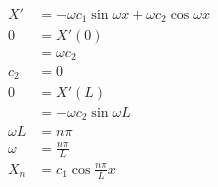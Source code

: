 \documentclass{article}
\begin{document}
\begin{align*}
  X'                                                   & = -\omega c_1 \sin \omega x + \omega c_2 \cos \omega x                                                                                                                                                  \\
  0                                                    & = X'(0)                                                                                                                                                                                                 \\
                                                       & = \omega c_2                                                                                                                                                                                            \\
  c_2                                                  & = 0                                                                                                                                                                                                     \\
  0                                                    & = X'(L)                                                                                                                                                                                                 \\
                                                       & = -\omega c_2 \sin \omega L                                                                                                                                                                             \\
  \omega L                                             & = n \pi                                                                                                                                                                                                 \\
  \omega                                               & = \frac{n \pi}{L}                                                                                                                                                                                       \\
  X_n                                                  & = c_1 \cos \frac{n \pi}{L} x                                                                                                                                                                            \\

\end{align*}
\end{document}
